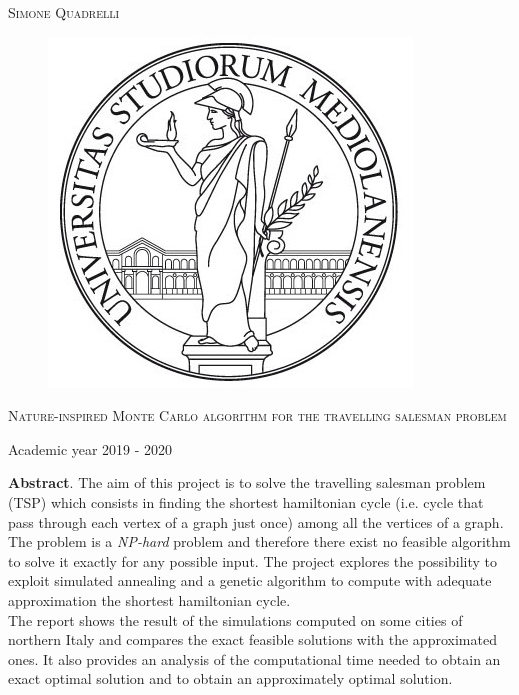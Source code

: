 \documentclass{article}
\begin{document}
\begin{titlepage}
	
	
	\begin{center}
		\vspace{2 cm}
		{\Large \textsc{Simone Quadrelli} }
	\end{center}
	
	
	\begin{figure}[H]
		\vspace{2 cm}
		\centering
		\includegraphics[width=0.30\linewidth]{tesiSCIENZE_TECNOLOGIE.jpg}
		
	\end{figure}
	
	\begin{center}
		\vspace{2 cm}
		{\Large \textsc{Nature-inspired Monte Carlo algorithm for the travelling salesman problem} }
	\end{center}

	\par
	\vspace{3 cm}
	
	\begin{center}
		{\large Academic year 2019 - 2020}
	\end{center}
\end{titlepage}

\newpage 
{}
\tableofcontents
\listoffigures
\newpage

\noindent \textbf{Abstract}. The aim of this project is to solve the travelling salesman problem (TSP) which consists in finding the shortest hamiltonian cycle (i.e. cycle that pass through each vertex of a graph just once) among all the vertices of a graph. \\
The problem is a \textit{NP-hard} problem and therefore there exist no feasible algorithm to solve it exactly for any possible input. The project explores the possibility to exploit simulated annealing and a genetic algorithm to compute with adequate approximation the shortest hamiltonian cycle.\\
The report shows the result of the simulations computed on some cities of northern Italy and compares the exact feasible solutions with the approximated ones. It also provides an analysis of the computational time needed to obtain an exact optimal solution and to obtain an approximately optimal solution.
\end{document}
